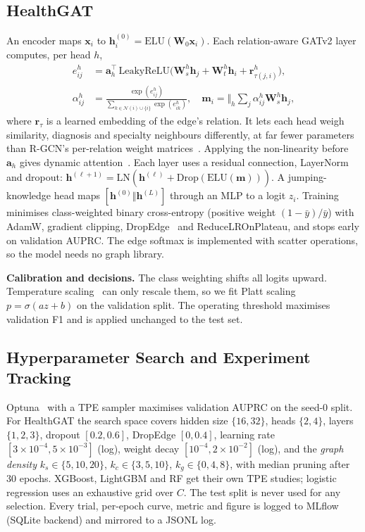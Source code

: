 \documentclass[conference]{IEEEtran}
\begin{document}
\subsection{HealthGAT}
An encoder maps $\mathbf{x}_i$ to $\mathbf{h}^{(0)}_i=\mathrm{ELU}(\mathbf{W}_0\mathbf{x}_i)$.
Each relation-aware GATv2 layer computes, per head $h$,
\begin{align}
e^{h}_{ij} &= \mathbf{a}_h^{\top}\,\mathrm{LeakyReLU}\big(\mathbf{W}^h_s\mathbf{h}_j+\mathbf{W}^h_t\mathbf{h}_i+\mathbf{r}^h_{\tau(j,i)}\big),\\
\alpha^h_{ij} &= \frac{\exp(e^h_{ij})}{\sum_{k\in\mathcal{N}(i)\cup\{i\}}\exp(e^h_{ik})},\quad
\mathbf{m}_i=\big\Vert_{h}\sum_{j}\alpha^h_{ij}\mathbf{W}^h_s\mathbf{h}_j,
\end{align}
where $\mathbf{r}_{\tau}$ is a learned embedding of the edge's relation. It lets each head
weigh similarity, diagnosis and specialty neighbours differently, at far fewer parameters than
R-GCN's per-relation weight matrices~\cite{schlichtkrull2018}. Applying the non-linearity before
$\mathbf{a}_h$ gives dynamic attention~\cite{brody2022}. Each layer uses a residual connection,
LayerNorm and dropout: $\mathbf{h}^{(\ell+1)}=\mathrm{LN}(\mathbf{h}^{(\ell)}+\mathrm{Drop}(\mathrm{ELU}(\mathbf{m})))$.
A jumping-knowledge head maps $[\mathbf{h}^{(0)}\Vert\mathbf{h}^{(L)}]$ through an MLP to a
logit $z_i$. Training minimises class-weighted binary cross-entropy (positive weight
$(1-\bar y)/\bar y$) with AdamW, gradient clipping, DropEdge~\cite{rong2020} and
ReduceLROnPlateau, and stops early on validation AUPRC. The edge softmax is implemented with
scatter operations, so the model needs no graph library.

\textbf{Calibration and decisions.} The class weighting shifts all logits upward. Temperature
scaling~\cite{guo2017} can only rescale them, so we fit Platt scaling~\cite{platt1999}
$p=\sigma(az+b)$ on the validation split. The operating threshold maximises validation F1 and
is applied unchanged to the test set.

\subsection{Hyperparameter Search and Experiment Tracking}
Optuna~\cite{akiba2019} with a TPE sampler maximises validation AUPRC on the seed-0 split. For
HealthGAT the search space covers hidden size $\{16,32\}$, heads $\{2,4\}$, layers $\{1,2,3\}$,
dropout $[0.2,0.6]$, DropEdge $[0,0.4]$, learning rate $[3{\times}10^{-4},5{\times}10^{-3}]$
(log), weight decay $[10^{-4},2{\times}10^{-2}]$ (log), and the \emph{graph density}
$k_s\in\{5,10,20\}$, $k_c\in\{3,5,10\}$, $k_g\in\{0,4,8\}$, with median pruning after 30
epochs. XGBoost, LightGBM and RF get their own TPE studies; logistic regression uses an
exhaustive grid over $C$. The test split is never used for any selection. Every trial,
per-epoch curve, metric and figure is logged to MLflow~\cite{zaharia2018} (SQLite backend) and
mirrored to a JSONL log.
\end{document}
